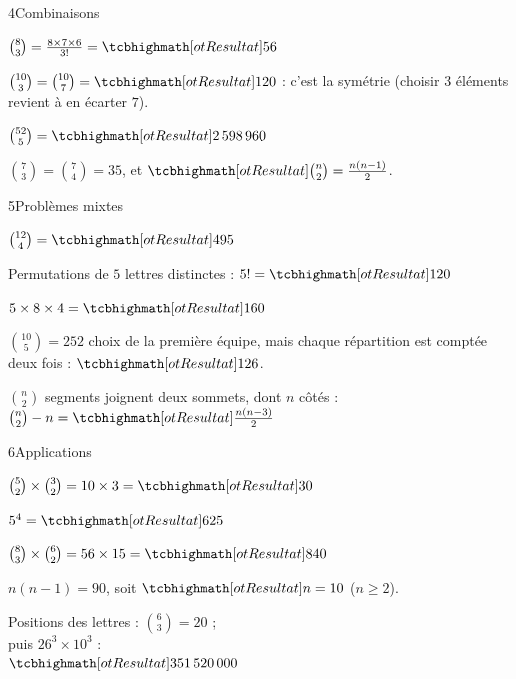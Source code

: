 \begin{deuxcolonnes}
\begin{corrige}{4}{Combinaisons}
\begin{questions}
  \item $\binom83=\frac{8\times7\times6}{3!}=\res{56}$
  \item $\binom{10}{3}=\binom{10}{7}=\res{120}$ : c'est la symétrie (choisir $3$ éléments revient à en écarter $7$).
  \item $\binom{52}{5}=\res{2\,598\,960}$
  \item $\binom73=\binom74=35$, et $\res{\binom n2=\frac{n(n-1)}{2}}$.
\end{questions}
\end{corrige}

\begin{corrige}{5}{Problèmes mixtes}
\begin{questions}
  \item $\binom{12}{4}=\res{495}$
  \item Permutations de $5$ lettres distinctes : $5!=\res{120}$
  \item $5\times8\times4=\res{160}$
  \item $\binom{10}{5}=252$ choix de la première équipe, mais chaque répartition est comptée deux fois : $\res{126}$.
  \item $\binom n2$ segments joignent deux sommets, dont $n$ côtés :\\ $\binom n2-n=\res{\frac{n(n-3)}{2}}$
\end{questions}
\end{corrige}

\begin{corrige}{6}{Applications}
\begin{questions}
  \item $\binom52\times\binom32=10\times3=\res{30}$
  \item $5^{4}=\res{625}$
  \item $\binom83\times\binom62=56\times15=\res{840}$
  \item $n(n-1)=90$, soit $\res{n=10}$ ($n\geq2$).
  \item Positions des lettres : $\binom63=20$ ;\\ puis $26^{3}\times10^{3}$ :\\ $\res{351\,520\,000}$
\end{questions}
\end{corrige}


\end{deuxcolonnes}
